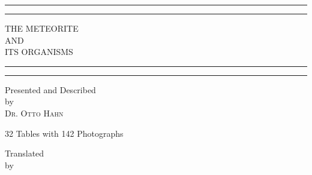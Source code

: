 \documentclass[a4paper, 12pt, oneside]{article}
\begin{document}
\begin{titlepage} %
	\centering %
	\scshape %

	
	\rule{\textwidth}{1.6pt}\vspace*{-\baselineskip}\vspace*{2pt} %
	\rule{\textwidth}{0.4pt} %
	
	\vspace{0.75\baselineskip} %
	
	{\LARGE THE METEORITE\\ AND\\ ITS ORGANISMS\\} %
	
	\vspace{0.75\baselineskip} %
	
	\rule{\textwidth}{0.4pt}\vspace*{-\baselineskip}\vspace{3.2pt} %
	\rule{\textwidth}{1.6pt} %
	
	\vspace{1\baselineskip} %
	
	
	{Presented and Described\\ by\\ \scshape\Large Dr. Otto Hahn\\} %
	
	\vspace*{1\baselineskip} %
	
    {\small 32 Tables with 142 Photographs} %
    
	
	\vspace{1\baselineskip} %

	Translated\\ by\\
	

\end{titlepage}
\end{document}

